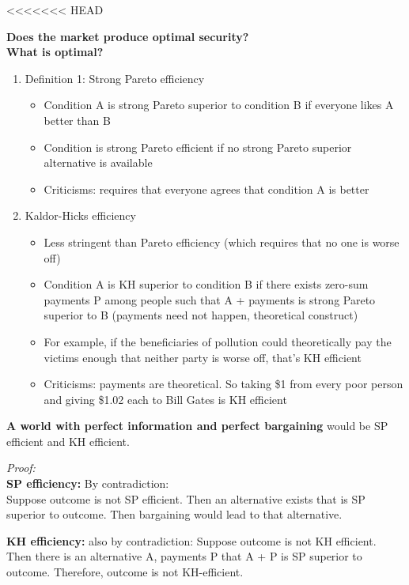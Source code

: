 <<<<<<< HEAD

\textbf{Does the market produce optimal security?}\\
\textbf{What is optimal?}

\begin{enumerate}
	\item Definition 1: Strong Pareto efficiency

	\begin{itemize}
		\item Condition A is strong Pareto superior to condition B if everyone likes A better than B
		\item Condition is strong Pareto efficient if no strong Pareto superior alternative is available
		\item Criticisms: requires that everyone agrees that condition A is better
	\end{itemize}
	
	\item Kaldor-Hicks efficiency

	\begin{itemize}
		\item Less stringent than Pareto efficiency (which requires that no one is worse off)
		\item  Condition A is KH superior to condition B if there exists zero-sum payments P among people such that A + payments is strong Pareto superior to B
	(payments need not happen, theoretical construct)
		\item For example, if the beneficiaries of pollution could theoretically pay the victims enough that neither party is worse off, that's KH efficient
		\item Criticisms: payments are theoretical. So taking \$1 from every poor person and giving \$1.02 each to Bill Gates is KH efficient
	\end{itemize}
\end{enumerate}

\textbf{A world with perfect information and perfect bargaining} would be SP efficient and KH efficient. 

\textit{Proof:}\\
\textbf{SP efficiency:} By contradiction: \\
	Suppose outcome is not SP efficient. Then an alternative exists that is SP superior to outcome. Then bargaining would lead to that alternative.

\textbf{KH efficiency:} also by contradiction:
	Suppose outcome is not KH efficient. Then there is an alternative A, payments P that A + P is SP superior to outcome. Therefore, outcome is not KH-efficient.

